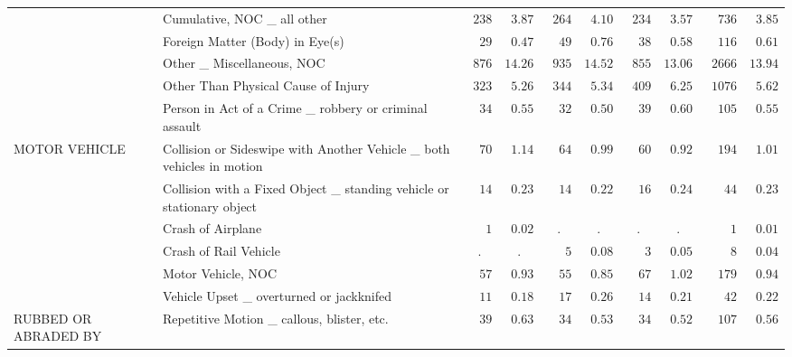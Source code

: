 \documentclass[9pt, oneside]{article}   	%
\begin{document}
\begin{longtable}{p{1.8in}p{2.2in}cccccccc}
 & Cumulative, NOC \_ all other  & $\phantom{0}238$ & $\phantom{0}3.87$ & $\phantom{0}264$ & $\phantom{0}4.10$ & $\phantom{0}234$ & $\phantom{0}3.57$ & $\phantom{00}736$ & $\phantom{0}3.85$ \\
 & Foreign Matter (Body) in Eye(s)  & $\phantom{00}29$ & $\phantom{0}0.47$ & $\phantom{00}49$ & $\phantom{0}0.76$ & $\phantom{00}38$ & $\phantom{0}0.58$ & $\phantom{00}116$ & $\phantom{0}0.61$ \\
 & Other \_ Miscellaneous, NOC  & $\phantom{0}876$ & $14.26$ & $\phantom{0}935$ & $14.52$ & $\phantom{0}855$ & $13.06$ & $\phantom{0}2666$ & $13.94$ \\
 & Other Than Physical Cause of Injury  & $\phantom{0}323$ & $\phantom{0}5.26$ & $\phantom{0}344$ & $\phantom{0}5.34$ & $\phantom{0}409$ & $\phantom{0}6.25$ & $\phantom{0}1076$ & $\phantom{0}5.62$ \\
 & Person in Act of a Crime \_ robbery or criminal assault  & $\phantom{00}34$ & $\phantom{0}0.55$ & $\phantom{00}32$ & $\phantom{0}0.50$ & $\phantom{00}39$ & $\phantom{0}0.60$ & $\phantom{00}105$ & $\phantom{0}0.55$ \\
MOTOR VEHICLE & Collision or Sideswipe with Another Vehicle \_ both vehicles in motion  & $\phantom{00}70$ & $\phantom{0}1.14$ & $\phantom{00}64$ & $\phantom{0}0.99$ & $\phantom{00}60$ & $\phantom{0}0.92$ & $\phantom{00}194$ & $\phantom{0}1.01$ \\
 & Collision with a Fixed Object \_ standing vehicle or stationary object  & $\phantom{00}14$ & $\phantom{0}0.23$ & $\phantom{00}14$ & $\phantom{0}0.22$ & $\phantom{00}16$ & $\phantom{0}0.24$ & $\phantom{000}44$ & $\phantom{0}0.23$ \\
 & Crash of Airplane  & $\phantom{000}1$ & $\phantom{0}0.02$ & . & . & . & . & $\phantom{0000}1$ & $\phantom{0}0.01$ \\
 & Crash of Rail Vehicle  & . & . & $\phantom{000}5$ & $\phantom{0}0.08$ & $\phantom{000}3$ & $\phantom{0}0.05$ & $\phantom{0000}8$ & $\phantom{0}0.04$ \\
 & Motor Vehicle, NOC  & $\phantom{00}57$ & $\phantom{0}0.93$ & $\phantom{00}55$ & $\phantom{0}0.85$ & $\phantom{00}67$ & $\phantom{0}1.02$ & $\phantom{00}179$ & $\phantom{0}0.94$ \\
 & Vehicle Upset \_ overturned or jackknifed  & $\phantom{00}11$ & $\phantom{0}0.18$ & $\phantom{00}17$ & $\phantom{0}0.26$ & $\phantom{00}14$ & $\phantom{0}0.21$ & $\phantom{000}42$ & $\phantom{0}0.22$ \\
RUBBED OR ABRADED BY & Repetitive Motion \_ callous, blister, etc.  & $\phantom{00}39$ & $\phantom{0}0.63$ & $\phantom{00}34$ & $\phantom{0}0.53$ & $\phantom{00}34$ & $\phantom{0}0.52$ & $\phantom{00}107$ & $\phantom{0}0.56$ \\

\end{longtable}
\end{document}
